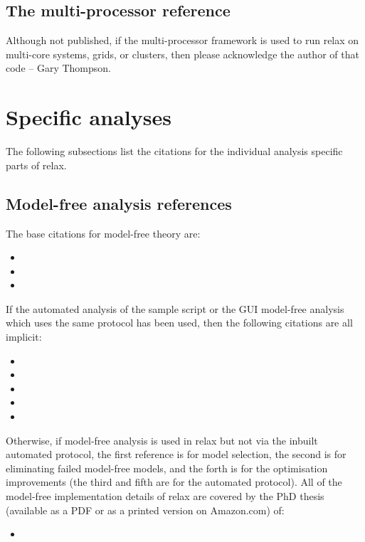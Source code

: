 
\subsection*{The multi-processor reference}

Although not published, if the multi-processor framework is used to run relax on multi-core systems, grids, or clusters, then please acknowledge the author of that code -- Gary Thompson.




\section*{Specific analyses}

The following subsections list the citations for the individual analysis specific parts of relax.



\subsection*{Model-free analysis references}

The base citations for model-free theory are:
\begin{itemize}
  \item {}
  \item {}
  \item {}
\end{itemize}

If the automated analysis of the  sample script or the GUI model-free analysis which uses the same protocol has been used, then the following citations are all implicit:
\begin{itemize}
  \item {}
  \item {}
  \item {}
  \item {}
  \item {}
\end{itemize}

Otherwise, if model-free analysis is used in relax but not via the inbuilt automated protocol, the first reference is for model selection, the second is for eliminating failed model-free models, and the forth is for the optimisation improvements (the third and fifth are for the automated protocol).
All of the model-free implementation details of relax are covered by the PhD thesis (available as a PDF or as a printed version on Amazon.com) of:
\begin{itemize}
  \item {}
\end{itemize}

